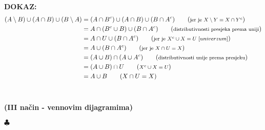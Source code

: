 \documentclass{article}
\newenvironment{dokaz}
    {\noindent\textbf{DOKAZ:}\\} {\hfill $\clubsuit$}
\begin{document}
\begin{dokaz}
        \begin{align*}
            (A\setminus B)\cup (A\cap B)\cup (B\setminus A) &= (A\cap B^c)\cup (A\cap B)\cup (B\cap A^c)    \tag{\textrm{\footnotesize jer je $X\setminus Y=X\cap Y^c$}} \\
                                                            &= A\cap (B^c\cup B)\cup (B\cap A^c)            \tag{\textrm{\footnotesize distributivnosti presjeka prema uniji}}\\
                                                            &= A\cap U\cup (B\cap A^c)                      \tag{\textrm{\footnotesize jer je $X^c\cup X=U\ [univerzum]$}}\\
                                                            &= A\cup (B\cap A^c)                            \tag{\textrm{\footnotesize jer je $X\cap U=X$}}\\
                                                            &= (A\cup B)\cap (A\cup A^c)                    \tag{\textrm{\footnotesize distributivnosti unije prema presjeku}}\\
                                                            &= (A\cup B)\cap U                              \tag{\textrm{\footnotesize $X^c\cup X=U$}}\\
                                                            &= A\cup B\tag{$X\cap U=X$}
        \end{align*}\\

    \smallskip

    \newpage
    \noindent
    \textbf{(III način - vennovim dijagramima)}
    \smallskip


\end{dokaz}
\end{document}
